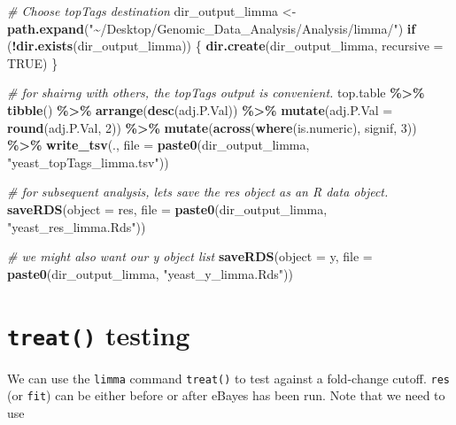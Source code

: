 \documentclass[
]{book}
\newenvironment{Shaded}{\begin{snugshade}}{\end{snugshade}}
\newcommand{\AttributeTok}[1]{\textcolor[rgb]{0.13,0.29,0.53}{#1}}
\newcommand{\CommentTok}[1]{\textcolor[rgb]{0.56,0.35,0.01}{\textit{#1}}}
\newcommand{\ConstantTok}[1]{\textcolor[rgb]{0.56,0.35,0.01}{#1}}
\newcommand{\ControlFlowTok}[1]{\textcolor[rgb]{0.13,0.29,0.53}{\textbf{#1}}}
\newcommand{\DecValTok}[1]{\textcolor[rgb]{0.00,0.00,0.81}{#1}}
\newcommand{\FunctionTok}[1]{\textcolor[rgb]{0.13,0.29,0.53}{\textbf{#1}}}
\newcommand{\NormalTok}[1]{#1}
\newcommand{\OtherTok}[1]{\textcolor[rgb]{0.56,0.35,0.01}{#1}}
\newcommand{\SpecialCharTok}[1]{\textcolor[rgb]{0.81,0.36,0.00}{\textbf{#1}}}
\newcommand{\StringTok}[1]{\textcolor[rgb]{0.31,0.60,0.02}{#1}}
\begin{document}
\begin{Shaded}
\begin{Highlighting}[]
\CommentTok{\# Choose topTags destination}
\NormalTok{dir\_output\_limma }\OtherTok{\textless{}{-}}
  \FunctionTok{path.expand}\NormalTok{(}\StringTok{"\textasciitilde{}/Desktop/Genomic\_Data\_Analysis/Analysis/limma/"}\NormalTok{)}
\ControlFlowTok{if}\NormalTok{ (}\SpecialCharTok{!}\FunctionTok{dir.exists}\NormalTok{(dir\_output\_limma)) \{}
  \FunctionTok{dir.create}\NormalTok{(dir\_output\_limma, }\AttributeTok{recursive =} \ConstantTok{TRUE}\NormalTok{)}
\NormalTok{\}}

\CommentTok{\# for shairng with others, the topTags output is convenient.}
\NormalTok{top.table }\SpecialCharTok{\%\textgreater{}\%} \FunctionTok{tibble}\NormalTok{() }\SpecialCharTok{\%\textgreater{}\%}
  \FunctionTok{arrange}\NormalTok{(}\FunctionTok{desc}\NormalTok{(adj.P.Val)) }\SpecialCharTok{\%\textgreater{}\%}
  \FunctionTok{mutate}\NormalTok{(}\AttributeTok{adj.P.Val =} \FunctionTok{round}\NormalTok{(adj.P.Val, }\DecValTok{2}\NormalTok{)) }\SpecialCharTok{\%\textgreater{}\%}
  \FunctionTok{mutate}\NormalTok{(}\FunctionTok{across}\NormalTok{(}\FunctionTok{where}\NormalTok{(is.numeric), signif, }\DecValTok{3}\NormalTok{)) }\SpecialCharTok{\%\textgreater{}\%}
  \FunctionTok{write\_tsv}\NormalTok{(., }\AttributeTok{file =} \FunctionTok{paste0}\NormalTok{(dir\_output\_limma, }\StringTok{"yeast\_topTags\_limma.tsv"}\NormalTok{))}

\CommentTok{\# for subsequent analysis, let\textquotesingle{}s save the res object as an R data object.}
\FunctionTok{saveRDS}\NormalTok{(}\AttributeTok{object =}\NormalTok{ res, }\AttributeTok{file =} \FunctionTok{paste0}\NormalTok{(dir\_output\_limma, }\StringTok{"yeast\_res\_limma.Rds"}\NormalTok{))}

\CommentTok{\# we might also want our y object list}
\FunctionTok{saveRDS}\NormalTok{(}\AttributeTok{object =}\NormalTok{ y, }\AttributeTok{file =} \FunctionTok{paste0}\NormalTok{(dir\_output\_limma, }\StringTok{"yeast\_y\_limma.Rds"}\NormalTok{))}
\end{Highlighting}
\end{Shaded}

\hypertarget{treat-testing}{%
\section{\texorpdfstring{\texttt{treat()} testing}{treat() testing}}\label{treat-testing}}

We can use the \texttt{limma} command \texttt{treat()} to test against a fold-change
cutoff. \texttt{res} (or \texttt{fit}) can be either before or after eBayes has been
run. Note that we need to use
\end{document}
